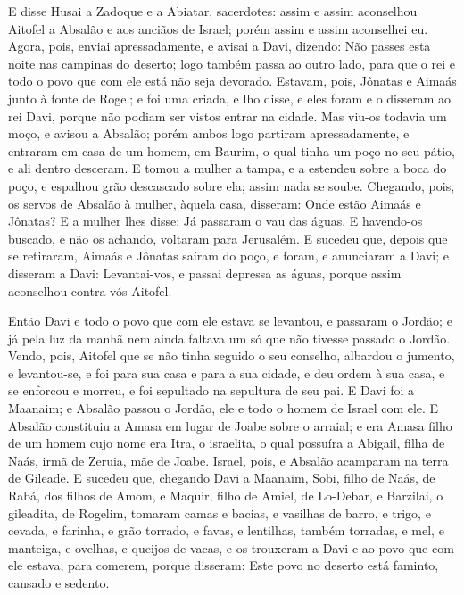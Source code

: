 E disse Husai a Zadoque e a Abiatar, sacerdotes: assim e assim
aconselhou Aitofel a Absalão e aos anciãos de Israel; porém assim e
assim aconselhei eu. Agora, pois, enviai apressadamente, e
avisai a Davi, dizendo: Não passes esta noite nas campinas do
deserto; logo também passa ao outro lado, para que o rei e todo o
povo que com ele está não seja devorado. Estavam, pois,
Jônatas e Aimaás junto à fonte de Rogel; e foi uma criada, e lho
disse, e eles foram e o disseram ao rei Davi, porque não podiam ser
vistos entrar na cidade. Mas viu-os todavia um moço, e avisou
a Absalão; porém ambos logo partiram apressadamente, e entraram em
casa de um homem, em Baurim, o qual tinha um poço no seu pátio, e
ali dentro desceram. E tomou a mulher a tampa, e a estendeu
sobre a boca do poço, e espalhou grão descascado sobre ela; assim
nada se soube. Chegando, pois, os servos de Absalão à mulher,
àquela casa, disseram: Onde estão Aimaás e Jônatas? E a mulher lhes
disse: Já passaram o vau das águas. E havendo-os buscado, e não os
achando, voltaram para Jerusalém. E sucedeu que, depois que
se retiraram, Aimaás e Jônatas saíram do poço, e foram, e anunciaram
a Davi; e disseram a Davi: Levantai-vos, e passai depressa as águas,
porque assim aconselhou contra vós Aitofel.

Então Davi e todo o povo que com ele estava se levantou, e
passaram o Jordão; e já pela luz da manhã nem ainda faltava um só
que não tivesse passado o Jordão. Vendo, pois, Aitofel que se
não tinha seguido o seu conselho, albardou o jumento, e levantou-se,
e foi para sua casa e para a sua cidade, e deu ordem à sua casa, e
se enforcou e morreu, e foi sepultado na sepultura de seu pai.
E Davi foi a Maanaim; e Absalão passou o Jordão, ele e todo o
homem de Israel com ele. E Absalão constituiu a Amasa em
lugar de Joabe sobre o arraial; e era Amasa filho de um homem cujo
nome era Itra, o israelita, o qual possuíra a Abigail, filha de
Naás, irmã de Zeruia, mãe de Joabe. Israel, pois, e Absalão
acamparam na terra de Gileade. E sucedeu que, chegando Davi a
Maanaim, Sobi, filho de Naás, de Rabá, dos filhos de Amom, e Maquir,
filho de Amiel, de Lo-Debar, e Barzilai, o gileadita, de Rogelim,
tomaram camas e bacias, e vasilhas de barro, e trigo, e
cevada, e farinha, e grão torrado, e favas, e lentilhas, também
torradas, e mel, e manteiga, e ovelhas, e queijos de vacas, e
os trouxeram a Davi e ao povo que com ele estava, para comerem,
porque disseram: Este povo no deserto está faminto, cansado e
sedento.

\medskip

